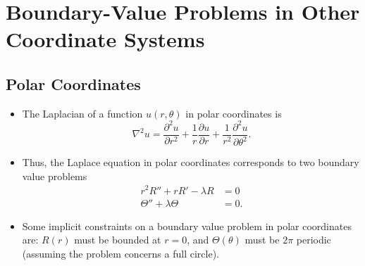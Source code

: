 \documentclass{article}
\begin{document}
\section{Boundary-Value Problems in Other Coordinate Systems}

\subsection{Polar Coordinates}

\begin{itemize}
  \item The Laplacian of a function $u(r, \theta)$ in polar coordinates is \[\nabla^2 u = \frac{\partial^2 u}{\partial r^2} + \frac{1}{r} \frac{\partial u}{\partial r} + \frac{1}{r^2} \frac{\partial^2 u}{\partial \theta^2}.\]

  \item Thus, the Laplace equation in polar coordinates corresponds to two boundary value problems \begin{align*}
          r^2 R'' + r R' - \lambda R & = 0  \\
          \Theta'' + \lambda \Theta  & = 0.
        \end{align*}

  \item Some implicit constraints on a boundary value problem in polar coordinates are: $R(r)$ must be bounded at $r = 0$, and $\Theta(\theta)$ must be $2 \pi$ periodic (assuming the problem concerns a full circle).
\end{itemize}
\end{document}
